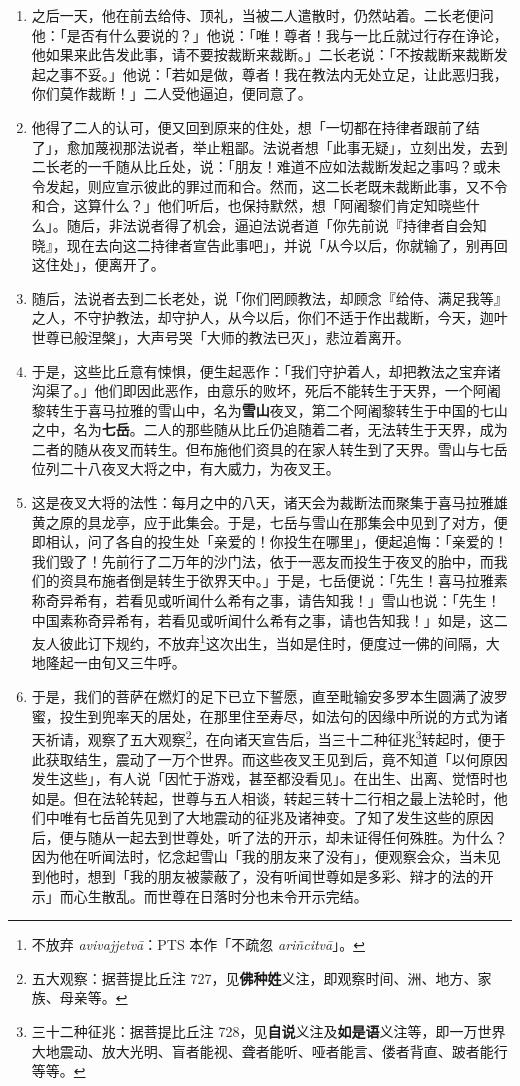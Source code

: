 \begin{enumerate}
\item 之后一天，他在前去给侍、顶礼，当被二人遣散时，仍然站着。二长老便问他：「是否有什么要说的？」他说：「唯！尊者！我与一比丘就过行存在诤论，他如果来此告发此事，请不要按裁断来裁断。」二长老说：「不按裁断来裁断发起之事不妥。」他说：「若如是做，尊者！我在教法内无处立足，让此恶归我，你们莫作裁断！」二人受他逼迫，便同意了。
\item 他得了二人的认可，便又回到原来的住处，想「一切都在持律者跟前了结了」，愈加蔑视那法说者，举止粗鄙。法说者想「此事无疑」，立刻出发，去到二长老的一千随从比丘处，说：「朋友！难道不应如法裁断发起之事吗？或未令发起，则应宣示彼此的罪过而和合。然而，这二长老既未裁断此事，又不令和合，这算什么？」他们听后，也保持默然，想「阿阇黎们肯定知晓些什么」。随后，非法说者得了机会，逼迫法说者道「你先前说『持律者自会知晓』，现在去向这二持律者宣告此事吧」，并说「从今以后，你就输了，别再回这住处」，便离开了。
\item 随后，法说者去到二长老处，说「你们罔顾教法，却顾念『给侍、满足我等』之人，不守护教法，却守护人，从今以后，你们不适于作出裁断，今天，迦叶世尊已般涅槃」，大声号哭「大师的教法已灭」，悲泣着离开。
\item 于是，这些比丘意有悚惧，便生起恶作：「我们守护着人，却把教法之宝弃诸沟渠了。」他们即因此恶作，由意乐的败坏，死后不能转生于天界，一个阿阇黎转生于喜马拉雅的雪山中，名为\textbf{雪山}夜叉，第二个阿阇黎转生于中国的七山之中，名为\textbf{七岳}。二人的那些随从比丘仍追随着二者，无法转生于天界，成为二者的随从夜叉而转生。但布施他们资具的在家人转生到了天界。雪山与七岳位列二十八夜叉大将之中，有大威力，为夜叉王。
\item 这是夜叉大将的法性：每月之中的八天，诸天会为裁断法而聚集于喜马拉雅雄黄之原的具龙亭，应于此集会。于是，七岳与雪山在那集会中见到了对方，便即相认，问了各自的投生处「亲爱的！你投生在哪里」，便起追悔：「亲爱的！我们毁了！先前行了二万年的沙门法，依于一恶友而投生于夜叉的胎中，而我们的资具布施者倒是转生于欲界天中。」于是，七岳便说：「先生！喜马拉雅素称奇异希有，若看见或听闻什么希有之事，请告知我！」雪山也说：「先生！中国素称奇异希有，若看见或听闻什么希有之事，请也告知我！」如是，这二友人彼此订下规约，不放弃\footnote{不放弃 \textit{avivajjetvā}：PTS 本作「不疏忽 \textit{ariñcitvā}」。}这次出生，当如是住时，便度过一佛的间隔，大地隆起一由旬又三牛呼。
\item 于是，我们的菩萨在燃灯的足下已立下誓愿，直至毗输安多罗本生圆满了波罗蜜，投生到兜率天的居处，在那里住至寿尽，如法句的因缘中所说的方式为诸天祈请，观察了五大观察\footnote{五大观察：据菩提比丘注 727，见\textbf{佛种姓}义注，即观察时间、洲、地方、家族、母亲等。}，在向诸天宣告后，当三十二种征兆\footnote{三十二种征兆：据菩提比丘注 728，见\textbf{自说}义注及\textbf{如是语}义注等，即一万世界大地震动、放大光明、盲者能视、聋者能听、哑者能言、偻者背直、跛者能行等等。}转起时，便于此获取结生，震动了一万个世界。而这些夜叉王见到后，竟不知道「以何原因发生这些」，有人说「因忙于游戏，甚至都没看见」。在出生、出离、觉悟时也如是。但在法轮转起，世尊与五人相谈，转起三转十二行相之最上法轮时，他们中唯有七岳首先见到了大地震动的征兆及诸神变。了知了发生这些的原因后，便与随从一起去到世尊处，听了法的开示，却未证得任何殊胜。为什么？因为他在听闻法时，忆念起雪山「我的朋友来了没有」，便观察会众，当未见到他时，想到「我的朋友被蒙蔽了，没有听闻世尊如是多彩、辩才的法的开示」而心生散乱。而世尊在日落时分也未令开示完结。

\end{enumerate}
